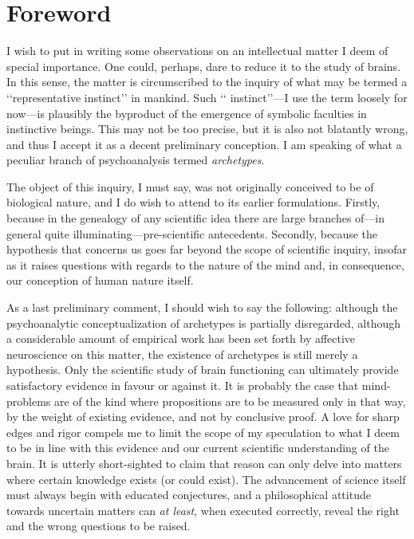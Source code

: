 \documentclass[a4paper]{article}
\begin{document}
    \section{Foreword}

    I wish to put in writing some observations on an intellectual matter I deem
    of special importance. One could, perhaps, dare to reduce it to the study of
    brains. In this sense, the matter is circumscribed to the inquiry of what may be
    termed a \lq\lq representative instinct\rq\rq{} in mankind. Such \lq\lq
    instinct\rq\rq{}---I use the term loosely for now---is plausibly the
    byproduct of the emergence of symbolic faculties in instinctive beings.
    This may not be too precise, but it is also not blatantly wrong, and thus I
    accept it as a decent preliminary conception. I am speaking of what a
    peculiar branch of psychoanalysis termed \textit{archetypes}.

    The object of this inquiry, I must say, was not originally conceived to be of
    biological nature, and I do wish to attend to its earlier formulations.
    Firstly, because in the genealogy of any scientific idea there are large
    branches of---in general quite illuminating---pre-scientific antecedents.
    Secondly, because the hypothesis that concerns us goes far beyond the scope of
    scientific inquiry, insofar as it raises questions with regards to
    the nature of the mind and, in consequence, our conception of human nature
    itself.

    As a last preliminary comment, I should wish to say the following: although
    the psychoanalytic conceptualization of archetypes is partially disregarded,
    although a considerable amount of empirical work has been set forth by
    affective neuroscience on this matter, the existence of archetypes is still
    merely a hypothesis. Only the scientific study of brain functioning can
    ultimately provide satisfactory evidence in favour or against it. It is
    probably the case that mind-problems are of the kind where propositions are
    to be measured only in that way, by the weight of existing evidence, and not
    by conclusive proof. A love for sharp edges and rigor compels me to limit
    the scope of my speculation to what I deem to be in line with this
    evidence and our current scientific understanding of the brain. It is
    utterly short-sighted to claim that reason can only delve into matters where
    certain knowledge exists (or could exist). The advancement of science itself
    must always begin with educated conjectures, and a philosophical attitude
    towards uncertain matters can \textit{at least}, when executed correctly,
    reveal the right and the wrong questions to be raised.
\end{document}

